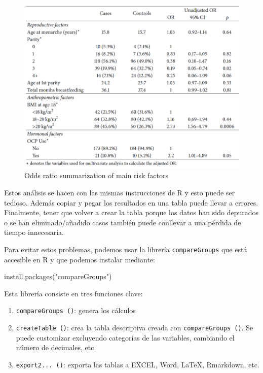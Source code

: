 \documentclass[
]{book}
\newenvironment{Shaded}{\begin{snugshade}}{\end{snugshade}}
\newcommand{\FunctionTok}[1]{\textcolor[rgb]{0.00,0.00,0.00}{#1}}
\newcommand{\NormalTok}[1]{#1}
\newcommand{\StringTok}[1]{\textcolor[rgb]{0.31,0.60,0.02}{#1}}
\begin{document}
\begin{figure}
\centering
\includegraphics{figures/table4.png}
\caption{Odds ratio summarization of main risk factors}
\end{figure}

Estos análisis se hacen con las mismas instrucciones de R y esto puede ser tedioso. Además copiar y pegar los resultados en una tabla puede llevar a errores. Finalmente, tener que volver a crear la tabla porque los datos han sido depurados o se han eliminado/añadido casos también puede conllevar a una pérdida de tiempo innecesaria.

Para evitar estos problemas, podemos usar la librería
\texttt{compareGroups} que está accesible en R y que podemos instalar mediante:

\begin{Shaded}
\begin{Highlighting}[]
\FunctionTok{install.packages}\NormalTok{(}\StringTok{"compareGroups"}\NormalTok{)}
\end{Highlighting}
\end{Shaded}

Esta librería consiste en tres funciones clave:

\begin{enumerate}
\def\labelenumi{\arabic{enumi}.}
\item
  \texttt{compareGroups\ ()}: genera los cálculos
\item
  \texttt{createTable\ ()}: crea la tabla descriptiva creada con \texttt{compareGroups\ ()}. Se puede customizar excluyendo categorías de las variables, cambiando el número de decimales, etc.
\item
  \texttt{export2...\ ()}: exporta las tablas a EXCEL, Word, LaTeX, Rmarkdown, etc.
\end{enumerate}
\end{document}
